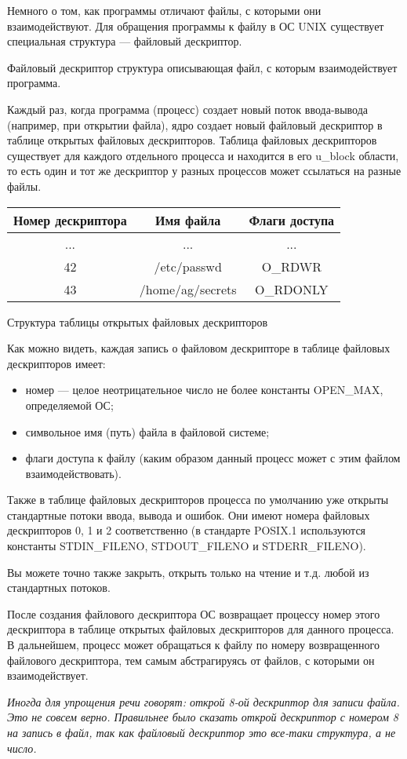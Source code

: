 Немного о том, как программы отличают файлы, с которыми они взаимодействуют. Для обращения программы к файлу в ОС UNIX существует специальная структура --- файловый дескриптор. 

\begin{defi}{Файловый дескриптор}
	структура описывающая файл, с которым взаимодействует программа.
\end{defi}

Каждый раз, когда программа (процесс) создает новый поток ввода-вывода (например, при открытии файла), ядро создает новый файловый дескриптор в таблице открытых файловых дескрипторов. Таблица файловых дескрипторов существует для каждого отдельного процесса и находится в его u\_block области, то есть один и тот же дескриптор у разных процессов может ссылаться на разные файлы.

\begin{center}
	\begin{tabular}{c|c|c}
		\textbf{Номер дескриптора} & \textbf{Имя файла} & \textbf{Флаги доступа} \\
		\hline
		... & ... & ... \\
		\hline
		42 & /etc/passwd & O\_RDWR \\
		\hline
		43 & /home/ag/secrets & O\_RDONLY \\
	\end{tabular}

	\caption{Структура таблицы открытых файловых дескрипторов}
\end{center}

Как можно видеть, каждая запись о файловом дескрипторе в таблице файловых дескрипторов имеет:

\begin{itemize}
	\item номер --- целое неотрицательное число не более константы OPEN\_MAX, определяемой ОС;
	\item символьное имя (путь) файла в файловой системе;
	\item флаги доступа к файлу (каким образом данный процесс может с этим файлом взаимодействовать).
\end{itemize}

\begin{important}
	Также в таблице файловых дескрипторов процесса по умолчанию уже открыты стандартные потоки ввода, вывода и ошибок. Они имеют номера файловых дескрипторов 0, 1 и 2 соответственно (в стандарте POSIX.1 используются константы STDIN\_FILENO, STDOUT\_FILENO и STDERR\_FILENO).

	Вы можете точно также закрыть, открыть только на чтение и т.д. любой из стандартных потоков.
\end{important}

После создания файлового дескриптора ОС возвращает процессу номер этого дескриптора в таблице открытых файловых дескрипторов для данного процесса. В дальнейшем, процесс может обращаться к файлу по номеру возвращенного файлового дескриптора, тем самым абстрагируясь от файлов, с которыми он взаимодействует.

\textit{Иногда для упрощения речи говорят: открой 8-ой дескриптор для записи файла. Это не совсем верно. Правильнее было сказать открой дескриптор с номером 8 на запись в файл, так как файловый дескриптор это все-таки структура, а не число.}
